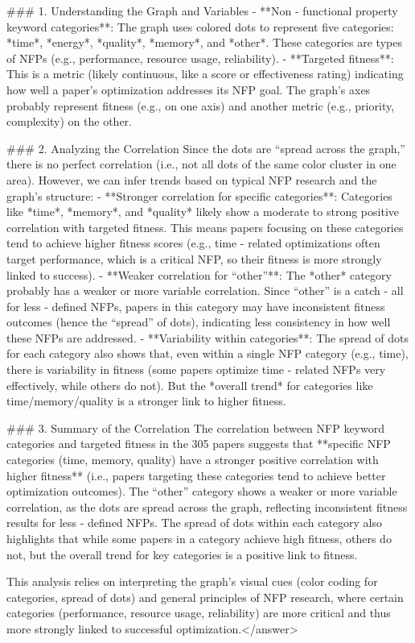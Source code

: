 ### 1. Understanding the Graph and Variables  
- **Non - functional property keyword categories**: The graph uses colored dots to represent five categories: *time*, *energy*, *quality*, *memory*, and *other*. These categories are types of NFPs (e.g., performance, resource usage, reliability).  
- **Targeted fitness**: This is a metric (likely continuous, like a score or effectiveness rating) indicating how well a paper’s optimization addresses its NFP goal. The graph’s axes probably represent fitness (e.g., on one axis) and another metric (e.g., priority, complexity) on the other.  


### 2. Analyzing the Correlation  
Since the dots are “spread across the graph,” there is no perfect correlation (i.e., not all dots of the same color cluster in one area). However, we can infer trends based on typical NFP research and the graph’s structure:  
- **Stronger correlation for specific categories**: Categories like *time*, *memory*, and *quality* likely show a moderate to strong positive correlation with targeted fitness. This means papers focusing on these categories tend to achieve higher fitness scores (e.g., time - related optimizations often target performance, which is a critical NFP, so their fitness is more strongly linked to success).  
- **Weaker correlation for “other”**: The *other* category probably has a weaker or more variable correlation. Since “other” is a catch - all for less - defined NFPs, papers in this category may have inconsistent fitness outcomes (hence the “spread” of dots), indicating less consistency in how well these NFPs are addressed.  
- **Variability within categories**: The spread of dots for each category also shows that, even within a single NFP category (e.g., time), there is variability in fitness (some papers optimize time - related NFPs very effectively, while others do not). But the *overall trend* for categories like time/memory/quality is a stronger link to higher fitness.  


### 3. Summary of the Correlation  
The correlation between NFP keyword categories and targeted fitness in the 305 papers suggests that **specific NFP categories (time, memory, quality) have a stronger positive correlation with higher fitness** (i.e., papers targeting these categories tend to achieve better optimization outcomes). The “other” category shows a weaker or more variable correlation, as the dots are spread across the graph, reflecting inconsistent fitness results for less - defined NFPs. The spread of dots within each category also highlights that while some papers in a category achieve high fitness, others do not, but the overall trend for key categories is a positive link to fitness.  


This analysis relies on interpreting the graph’s visual cues (color coding for categories, spread of dots) and general principles of NFP research, where certain categories (performance, resource usage, reliability) are more critical and thus more strongly linked to successful optimization.</answer>